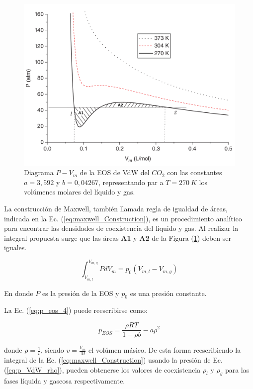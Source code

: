 \begin{figure}[htbp]
	\centering
	\includegraphics[width=.8\textwidth]{figs/cap4/Diagrama_P_V_del_CO2_Multiphase_LBM}
	\caption{Diagrama $P - V_m$ de la EOS de VdW del $CO_2$ con las constantes $a = 3,592$ y $b = 0,04267$, representando par a $T = 270 \> K$ los volúmenes molares del líquido y gas. \cite{huang2015multiphase}}
	\label{fig:P_V_CO2}	
\end{figure}

La construcción de Maxwell, también llamada regla de igualdad de áreas, indicada en la Ec. (\ref{eq:maxwell_Construction}), es un procedimiento analítico para encontrar las densidades de coexistencia del líquido y gas. Al realizar la integral propuesta surge que las áreas \textbf{A1} y \textbf{A2} de la Figura (\ref{fig:P_V_CO2}) deben ser iguales.

\begin{equation}
\int_{V_{m,l}}^{V_{m,g}} P d V_m = p_0 (V_{m,l} -  V_{m,g})
\label{eq:maxwell_Construction}
\end{equation}

En donde $P$ es la presión de la EOS y $p_0$ es una presión constante.

La Ec. (\ref{eq:p_eos_4}) puede reescribirse como:

\begin{equation}
	p_{EOS} = \frac{\rho R T}{1- \rho b} - a {\rho}^{2} 
	\label{eq:p_VdW_rho}
\end{equation}

donde $\rho = \frac{1}{v}$, siendo $v = \frac{V_m}{M}$ el volúmen másico. De esta forma reescribiendo la integral de la Ec. (\ref{eq:maxwell_Construction}) usando la presión de Ec. (\ref{eq:p_VdW_rho}), pueden obtenerse los valores de coexistencia $\rho_l$ y $\rho_g$ para las fases líquida y gaseosa respectivamente. 

